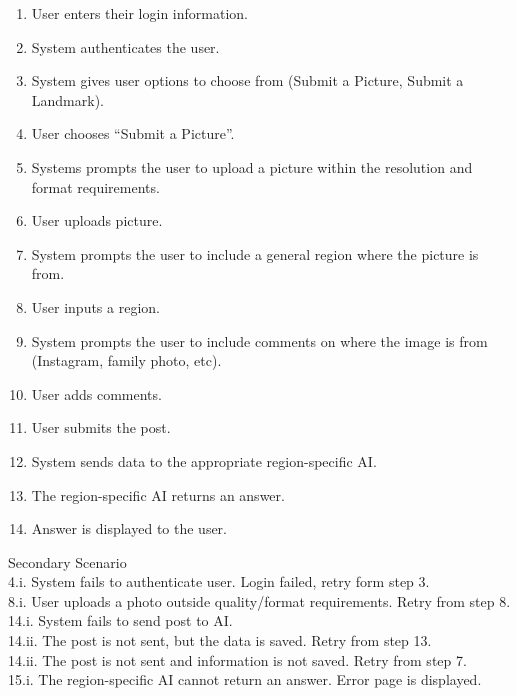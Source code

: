 \documentclass[]{article}
\begin{document}
\begin{enumerate}[{\bf BE1.}]
\begin{enumerate}[{\bf VP1.}]
\begin{enumerate}[{1.}]
                        \item User enters their login information.
                        \item System authenticates the user. 
                        \item System gives user options to choose from (Submit a Picture, Submit a Landmark). 
                        \item User chooses “Submit a Picture”. 
                        \item Systems prompts the user to upload a picture within the resolution and format requirements.
                        \item User uploads picture.
                        \item System prompts the user to include a general region where the picture is from. 
                        \item User inputs a region. 
                        \item System prompts the user to include comments on where the image is from (Instagram, family photo, etc). 
                        \item User adds comments.
                        \item User submits the post.
                        \item System sends data to the appropriate region-specific AI. 
                        \item The region-specific AI returns an answer. 
                        \item Answer is displayed to the user. \\
                    \end{enumerate}
                    Secondary Scenario \\
                    4.i. System fails to authenticate user. Login failed, retry form step 3. \\
                    8.i. User uploads a photo outside quality/format requirements. Retry from step 8.\\ 
                    14.i. System fails to send post to AI. \\
                    14.ii. The post is not sent, but the data is saved. Retry from step 13. \\
                    14.ii. The post is not sent and information is not saved. Retry from step 7. \\
                    15.i. The region-specific AI cannot return an answer. Error page is displayed. \\

\end{enumerate}
\end{enumerate}
\end{document}
